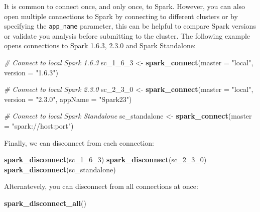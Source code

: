 \documentclass[]{book}
\newenvironment{Shaded}{\begin{snugshade}}{\end{snugshade}}
\newcommand{\CommentTok}[1]{\textcolor[rgb]{0.56,0.35,0.01}{\textit{#1}}}
\newcommand{\DataTypeTok}[1]{\textcolor[rgb]{0.13,0.29,0.53}{#1}}
\newcommand{\DecValTok}[1]{\textcolor[rgb]{0.00,0.00,0.81}{#1}}
\newcommand{\KeywordTok}[1]{\textcolor[rgb]{0.13,0.29,0.53}{\textbf{#1}}}
\newcommand{\NormalTok}[1]{#1}
\newcommand{\StringTok}[1]{\textcolor[rgb]{0.31,0.60,0.02}{#1}}
\theoremstyle{definition}
\theoremstyle{definition}
\theoremstyle{definition}
\theoremstyle{remark}
\begin{document}
It is common to connect once, and only once, to Spark. However, you can
also open multiple connections to Spark by connecting to different
clusters or by specifying the \texttt{app\_name} parameter, this can be
helpful to compare Spark versions or validate you analysis before
submitting to the cluster. The following example opens connections to
Spark 1.6.3, 2.3.0 and Spark Standalone:

\begin{Shaded}
\begin{Highlighting}[]
\CommentTok{# Connect to local Spark 1.6.3}
\NormalTok{sc_}\DecValTok{1}\NormalTok{_}\DecValTok{6}\NormalTok{_}\DecValTok{3}\NormalTok{ <-}\StringTok{ }\KeywordTok{spark_connect}\NormalTok{(}\DataTypeTok{master =} \StringTok{"local"}\NormalTok{, }\DataTypeTok{version =} \StringTok{"1.6.3"}\NormalTok{)}

\CommentTok{# Connect to local Spark 2.3.0}
\NormalTok{sc_}\DecValTok{2}\NormalTok{_}\DecValTok{3}\NormalTok{_}\DecValTok{0}\NormalTok{ <-}\StringTok{ }\KeywordTok{spark_connect}\NormalTok{(}\DataTypeTok{master =} \StringTok{"local"}\NormalTok{, }\DataTypeTok{version =} \StringTok{"2.3.0"}\NormalTok{, }\DataTypeTok{appName =} \StringTok{"Spark23"}\NormalTok{)}

\CommentTok{# Connect to local Spark Standalone}
\NormalTok{sc_standalone <-}\StringTok{ }\KeywordTok{spark_connect}\NormalTok{(}\DataTypeTok{master =} \StringTok{"spark://host:port"}\NormalTok{)}
\end{Highlighting}
\end{Shaded}

Finally, we can disconnect from each connection:

\begin{Shaded}
\begin{Highlighting}[]
\KeywordTok{spark_disconnect}\NormalTok{(sc_}\DecValTok{1}\NormalTok{_}\DecValTok{6}\NormalTok{_}\DecValTok{3}\NormalTok{)}
\KeywordTok{spark_disconnect}\NormalTok{(sc_}\DecValTok{2}\NormalTok{_}\DecValTok{3}\NormalTok{_}\DecValTok{0}\NormalTok{)}
\KeywordTok{spark_disconnect}\NormalTok{(sc_standalone)}
\end{Highlighting}
\end{Shaded}

Alternatevely, you can disconnect from all connections at once:

\begin{Shaded}
\begin{Highlighting}[]
\KeywordTok{spark_disconnect_all}\NormalTok{()}
\end{Highlighting}
\end{Shaded}
\end{document}
